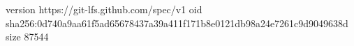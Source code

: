 version https://git-lfs.github.com/spec/v1
oid sha256:0d740a9aa61f5ad65678437a39a411f171b8e0121db98a24e7261c9d9049638d
size 87544
